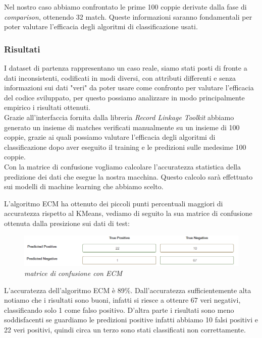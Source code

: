 \documentclass[a4paper,12pt]{article}
\begin{document}
\noindent Nel nostro caso abbiamo confrontato le prime 100 coppie derivate dalla fase di \textit{comparison}, ottenendo 32 match. Queste informazioni saranno fondamentali per poter valutare l'efficacia degli algoritmi di classificazione usati. \\


\subsubsection*{Risultati}
\noindent I dataset di partenza rappresentano un caso reale, siamo stati posti di fronte a dati inconsistenti, codificati in modi diversi, con attributi differenti e senza informazioni sui dati "veri" da poter usare come confronto per valutare l'efficacia del codice sviluppato, per questo possiamo analizzare in modo principalmente empirico i risultati ottenuti. \\

\noindent Grazie all'interfaccia fornita dalla libreria \textit{Record Linkage Toolkit} abbiamo generato un insieme di matches verificati manualmente su un insieme di 100 coppie, grazie ai quali possiamo valutare l'efficacia degli algoritmi di classificazione dopo aver eseguito il training e le predizioni sulle medesime 100 coppie. \\

\noindent Con la matrice di confusione vogliamo calcolare l'accuratezza statistica della predizione dei dati che esegue la nostra macchina. Questo calcolo sarà effettuato sui modelli di machine learning che abbiamo scelto. 

\noindent L'algoritmo ECM ha ottenuto dei piccoli punti percentuali maggiori di accuratezza rispetto al KMeans, vediamo di seguito la sua matrice di confusione ottenuta dalla presizione sui dati di test:

\begin{figure}[H]
	\centering
	\includegraphics[width=0.8\linewidth]{img/confusion_ecm.png}
	\caption{\textit{matrice di confusione con ECM}}
\end{figure}

\noindent L'accuratezza dell'algoritmo ECM è 89\%. Dall'accuratezza sufficientemente alta notiamo che i risultati sono  buoni, infatti si riesce a ottenre 67 veri negativi, classificando solo 1 come falso positivo. D'altra parte i risultati sono meno soddisfacenti se guardiamo le predizioni positive infatti abbiamo 10 falsi positivi e 22 veri positivi, quindi circa un terzo sono stati classificati non correttamente. \\
\end{document}
